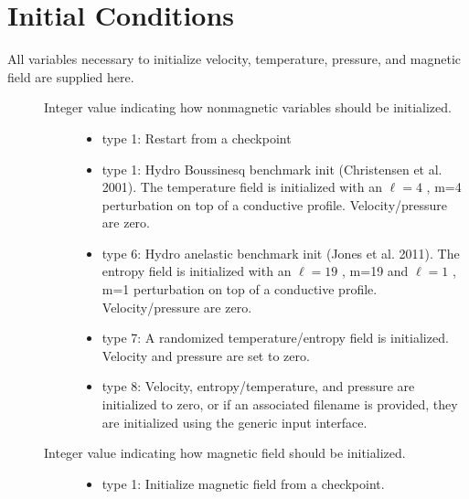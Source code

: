 \documentclass[letterpaper,11pt,english]{sphinxmanual}
\begin{document}
\section{Initial Conditions}
\label{\detokenize{doc/source/Namelist_Definitions/Namelist_Variables:initial-conditions}}
\sphinxAtStartPar
All variables necessary to initialize velocity, temperature, pressure, and magnetic field are supplied here.
\begin{description}
\item[{}] \leavevmode\begin{description}
\item[{Integer value indicating how nonmagnetic variables should be initialized.}] \leavevmode\begin{itemize}
\item {} 
\sphinxAtStartPar
type \sphinxhyphen{}1:  Restart from a checkpoint

\item {} 
\sphinxAtStartPar
type  1:  Hydro Boussinesq benchmark init (Christensen et al. 2001).  The temperature field is initialized with an \(\ell=4\) , m=4 perturbation on top of a conductive profile.  Velocity/pressure are zero.

\item {} 
\sphinxAtStartPar
type  6:  Hydro anelastic benchmark init (Jones et al. 2011).  The entropy field is initialized with an \(\ell=19\) , m=19 and \(\ell=1\) , m=1  perturbation on top of a conductive profile.  Velocity/pressure are zero.

\item {} 
\sphinxAtStartPar
type  7:  A randomized temperature/entropy field is initialized.  Velocity and pressure are set to zero.

\item {} 
\sphinxAtStartPar
type  8:  Velocity, entropy/temperature, and pressure are initialized to zero, or if an associated filename is provided, they are initialized using the generic input interface.

\end{itemize}

\end{description}

\item[{}] \leavevmode\begin{description}
\item[{Integer value indicating how magnetic field should be initialized.}] \leavevmode\begin{itemize}
\item {} 
\sphinxAtStartPar
type \sphinxhyphen{}1:  Initialize magnetic field from a checkpoint.


\end{itemize}
\end{description}
\end{description}
\end{document}
